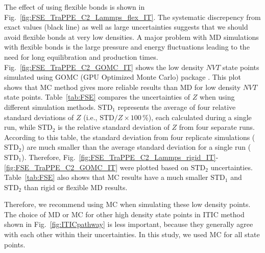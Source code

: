 \documentclass[%
 aip,
 jcp,
 sd,%
 amsmath,amssymb,
 reprint,%
]{revtex4-1}
\begin{document}
The effect of using flexible bonds is shown in Fig.~\ref{fig:FSE_TraPPE_C2_Lammps_flex_IT}. The systematic discrepency from exact values (black line) as well as large uncertainties suggests that we should avoid flexible bonds at very low densities. A major problem with MD simulations with flexible bonds is the large pressure and energy fluctuations leading to the need for long equilibration and production times.
Fig.~\ref{fig:FSE_TraPPE_C2_GOMC_IT} shows the low density $NVT$ state points simulated using GOMC (GPU Optimized Monte Carlo) package \cite{Mick2013}. This plot shows that MC method gives more reliable results than MD for low density $NVT$ state points. Table~\ref{tab:FSE} compares the uncertainties of $Z$ when using different simulation methods. $\mathrm{STD}_1$ represents the average of four relative standard deviations of $Z$ (i.e., $\mathrm{STD}/Z\times100 \, \%$), each calculated during a single run, while $\mathrm{STD}_2$ is the relative standard deviation of $Z$ from four separate runs. According to this table, the standard deviation from four replicate simulations ($\mathrm{STD}_2$) are much smaller than the average standard deviation for a single run ($\mathrm{STD}_1$). Therefore, Fig.~\ref{fig:FSE_TraPPE_C2_Lammps_rigid_IT}-\ref{fig:FSE_TraPPE_C2_GOMC_IT} were plotted based on $\mathrm{STD}_2$ uncertainties. Table~\ref{tab:FSE} also shows that MC results have a much smaller $\mathrm{STD}_1$ and $\mathrm{STD}_2$ than rigid or flexible MD results. 

Therefore, we recommend using MC when simulating these low density points. The choice of MD or MC for other high density state points in ITIC method shown in Fig.~\ref{fig:ITICpathway} is less important, because they generally agree with each other within their uncertainties. In this study, we used MC for all state points. 
\end{document}
